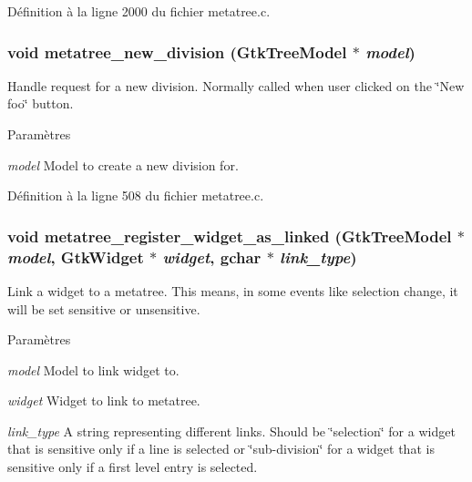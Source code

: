 Définition à la ligne 2000 du fichier metatree.c.

\subsubsection[{metatree\_\-new\_\-division}]{\setlength{\rightskip}{0pt plus 5cm}void metatree\_\-new\_\-division (GtkTreeModel $\ast$ {\em model})}\label{metatree_8h_a9d3ab11aa08343d4770b2baec4ae159b}
Handle request for a new division. Normally called when user clicked on the \char`\"{}New foo\char`\"{} button.


\begin{DoxyParams}{Paramètres}
\item[{\em model}]Model to create a new division for. \end{DoxyParams}


Définition à la ligne 508 du fichier metatree.c.

\subsubsection[{metatree\_\-register\_\-widget\_\-as\_\-linked}]{\setlength{\rightskip}{0pt plus 5cm}void metatree\_\-register\_\-widget\_\-as\_\-linked (GtkTreeModel $\ast$ {\em model}, \/  GtkWidget $\ast$ {\em widget}, \/  gchar $\ast$ {\em link\_\-type})}\label{metatree_8h_a84b23abc85668cd5270c2a36e2670668}
Link a widget to a metatree. This means, in some events like selection change, it will be set sensitive or unsensitive.


\begin{DoxyParams}{Paramètres}
\item[{\em model}]Model to link widget to. \item[{\em widget}]Widget to link to metatree. \item[{\em link\_\-type}]A string representing different links. Should be \char`\"{}selection\char`\"{} for a widget that is sensitive only if a line is selected or \char`\"{}sub-\/division\char`\"{} for a widget that is sensitive only if a first level entry is selected. \end{DoxyParams}


